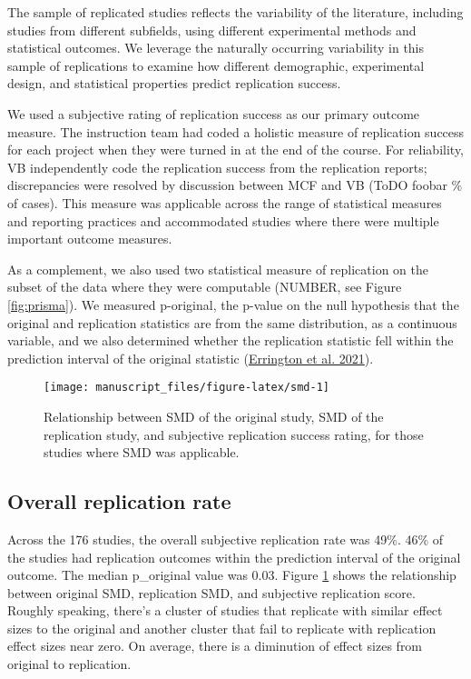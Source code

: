 \documentclass[
  english,
  a4paper,
]{article}
\begin{document}
The sample of replicated studies reflects the variability of the literature, including studies from different subfields, using different experimental methods and statistical outcomes. We leverage the naturally occurring variability in this sample of replications to examine how different demographic, experimental design, and statistical properties predict replication success.

We used a subjective rating of replication success as our primary outcome measure. The instruction team had coded a holistic measure of replication success for each project when they were turned in at the end of the course. For reliability, VB independently code the replication success from the replication reports; discrepancies were resolved by discussion between MCF and VB (ToDO foobar \% of cases). This measure was applicable across the range of statistical measures and reporting practices and accommodated studies where there were multiple important outcome measures.

As a complement, we also used two statistical measure of replication on the subset of the data where they were computable (NUMBER, see Figure \ref{fig:prisma}). We measured p-original, the p-value on the null hypothesis that the original and replication statistics are from the same distribution, as a continuous variable, and we also determined whether the replication statistic fell within the prediction interval of the original statistic (\protect\hyperlink{ref-errington2021}{Errington et al. 2021}).

\begin{figure}[ht]
\texttt{[image: manuscript\_files/figure-latex/smd-1]} \caption{Relationship between SMD of the original study, SMD of the replication study, and subjective replication success rating, for those studies where SMD was applicable.}\label{fig:smd}
\end{figure}

\hypertarget{overall-replication-rate}{%
\subsection{Overall replication rate}\label{overall-replication-rate}}

Across the 176 studies, the overall subjective replication rate was 49\%. 46\% of the studies had replication outcomes within the prediction interval of the original outcome. The median p\_original value was 0.03. Figure \ref{fig:smd} shows the relationship between original SMD, replication SMD, and subjective replication score. Roughly speaking, there's a cluster of studies that replicate with similar effect sizes to the original and another cluster that fail to replicate with replication effect sizes near zero. On average, there is a diminution of effect sizes from original to replication.
\end{document}
